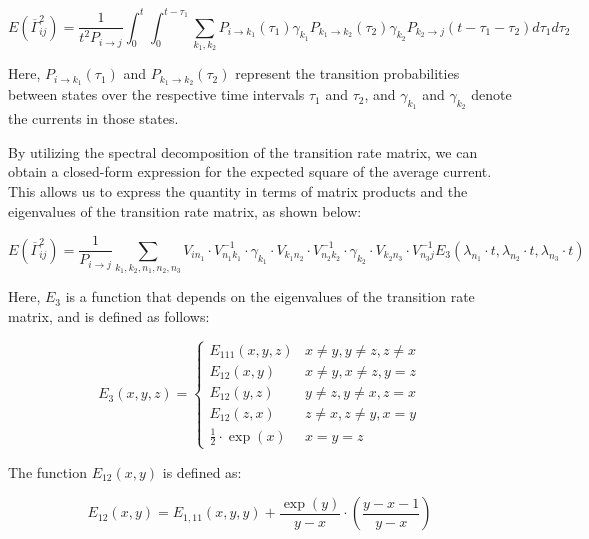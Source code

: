 \documentclass[pdflatex,sn-mathphys-num]{sn-jnl}%
\theoremstyle{thmstyleone}%
\theoremstyle{thmstyletwo}%
\theoremstyle{thmstylethree}%
\begin{document}
\begin{equation}
	E(\overline{\Gamma}_{ij}^2) = \frac{1}{t^2 P_{i \rightarrow j}} \int_0^t \int_0^{t-\tau_1} \sum_{k_1, k_2} P_{i \rightarrow k_1}(\tau_1) \gamma_{k_1} P_{k_1 \rightarrow k_2}(\tau_2) \gamma_{k_2} P_{k_2 \rightarrow j}(t-\tau_1-\tau_2) d\tau_1 d\tau_2
\end{equation}

Here, \(P_{i \rightarrow k_1}(\tau_1)\) and \(P_{k_1 \rightarrow k_2}(\tau_2)\) represent the transition probabilities between states over the respective time intervals \(\tau_1\) and \(\tau_2\), and \(\gamma_{k_1}\) and \(\gamma_{k_2}\) denote the currents in those states. 

By utilizing the spectral decomposition of the transition rate matrix, we can obtain a closed-form expression for the expected square of the average current. This allows us to express the quantity in terms of matrix products and the eigenvalues of the transition rate matrix, as shown below:

\begin{equation}
	E(\overline{\Gamma}_{ij}^2) = \frac{1}{P_{i \rightarrow j}} \sum_{k_1, k_2, n_1, n_2, n_3} V_{i n_1} \cdot V^{-1}_{n_1 k_1} \cdot \gamma_{k_1} \cdot V_{k_1 n_2} \cdot V^{-1}_{n_2 k_2} \cdot \gamma_{k_2} \cdot V_{k_2 n_3} \cdot V^{-1}_{n_3 j} E_3(\lambda_{n_1} \cdot t, \lambda_{n_2} \cdot t, \lambda_{n_3} \cdot t)
\end{equation}

Here, \(E_3\) is a function that depends on the eigenvalues of the transition rate matrix, and is defined as follows:

\begin{equation}
	E_3(x,y,z)= 
	\begin{cases}
		E_{111}(x,y,z) & x\neq y, y\neq z, z\neq x \\
		E_{12}(x,y) & x\neq y, x\neq z, y = z \\
		E_{12}(y,z) & y\neq z, y\neq x, z = x \\
		E_{12}(z,x) & z\neq x, z\neq y, x = y \\
		\frac{1}{2} \cdot \exp(x) & x=y=z
	\end{cases}
\end{equation}

The function \(E_{12}(x, y)\) is defined as:

\begin{equation}
	E_{12}(x,y) = E_{1,11}(x, y, y) + \frac{\exp(y)}{y - x} \cdot \left(\frac{y - x - 1}{y - x}\right)
\end{equation}
\end{document}

